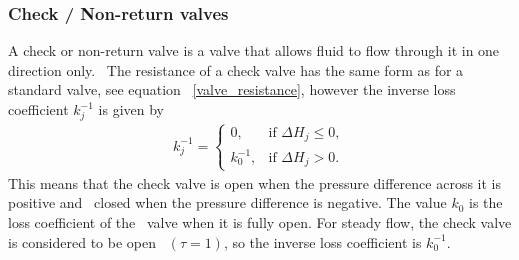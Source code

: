 \subsubsection{Check / Non-return valves}

A check or non-return valve is a valve that allows fluid to flow through it in one direction only. \ 
The resistance of a check valve has the same form as for a standard valve, see equation \ 
\eqref{valve_resistance}, however the inverse loss coefficient $k_j^{-1}$ is given by
\begin{align}
    \boxed{ 
        k_j^{-1} = 
        \begin{cases}
            0, & \text{if } \Delta H_j \leq 0, \\
            k_0^{-1}, & \text{if } \Delta H_j > 0.
        \end{cases}
    }
\end{align}
This means that the check valve is open when the pressure difference across it is positive and \ 
closed when the pressure difference is negative. The value $k_0$ is the loss coefficient of the \ 
valve when it is fully open. For steady flow, the check valve is considered to be open \ 
$(\tau = 1)$, so the inverse loss coefficient is $k_0^{-1}$. 
